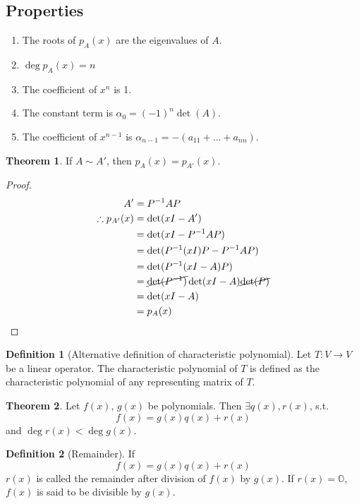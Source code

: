 \documentclass[fleqn, a4paper, 12pt, draft]{article}
\theoremstyle{definition}
\newtheorem{definition}{Definition} %
\theoremstyle{theorem}
\newtheorem{theorem}{Theorem} %
\theoremstyle{remark}
\numberwithin{corollary}{theorem}
\numberwithin{equation}{theorem}
\begin{document}
\subsection{Properties}

\begin{enumerate}
	\item The roots of $p_A (x)$ are the eigenvalues of $A$.
	\item $\deg p_A (x) = n$
	\item The coefficient of $x^n$ is 1.
	\item The constant term is $\alpha_0 = (-1)^n \det (A)$.
	\item The coefficient of $x^{n - 1}$ is $\alpha_{n - 1} = -(a_{11} + \dots + a_{nn})$.
\end{enumerate}

\begin{theorem}
	If $A \sim A'$, then $p_A (x) = p_{A'} (x)$.
\end{theorem}

\begin{proof}
	\begin{align*}
		A' &= P^{-1} A P\\
		\therefore p_{A'} (x) &= \det (xI - A')\\
		&= \det (xI - P^{-1} A P)\\
		&= \det (P^{-1} (xI) P - P^{-1} A P)\\
		&= \det (P^{-1}(xI - A) P)\\
		&= \cancel{\det(P^{-1})} \det(xI - A) \cancel{\det(P)}\\
		&= \det(xI - A)\\
		&= p_A (x)
	\end{align*}
\end{proof}

\begin{definition}[Alternative definition of characteristic polynomial]
	Let $T : V \to V$ be a linear operator. The characteristic polynomial of $T$ is defined as the characteristic polynomial of any representing matrix of $T$.
\end{definition}

\begin{theorem}
	Let $f(x)$, $g(x)$ be polynomials. Then $\exists q(x), r(x)$, s.t.
	\begin{equation*}
		f(x) = g(x) q(x) + r(x)
	\end{equation*}
	and $\deg r(x) < \deg g(x)$.
\end{theorem}

\begin{definition}[Remainder]
	If
	\begin{equation*}
		f(x) = g(x) q(x) + r(x)
	\end{equation*}
	$r(x)$ is called the remainder after division of $f(x)$ by $g(x)$. If $r(x) = \mathbb{O}$, $f(x)$ is said to be divisible by $g(x)$.
\end{definition}
\end{document}
